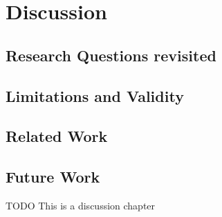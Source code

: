 \chapter{Discussion}
\section{Research Questions revisited}
\section{Limitations and Validity}
\section{Related Work}
\section{Future Work}
TODO This is a discussion chapter